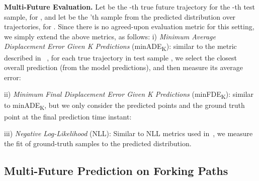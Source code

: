 \documentclass[10pt,twocolumn,letterpaper]{article}
\begin{document}
\noindent\textbf{Multi-Future Evaluation.}
Let  be the -th true future trajectory for the -th test sample, for ,
and let  be the 'th sample from the predicted
distribution over trajectories, for .
Since there is no agreed-upon evaluation metric for this setting,
we simply extend the above metrics, as follows:
\noindent i) \textit{Minimum Average Displacement Error Given K Predictions} (minADE\textsubscript{K}): similar to the metric described in ~\cite{chai2019multipath, rhinehart2018r2p2,rhinehart2019precog, gupta2018social}, for each true trajectory  in test sample ,
we select
the closest overall prediction (from the  model predictions),
and then measure its average error:


\noindent ii) \textit{Minimum Final Displacement Error Given K Predictions} (minFDE\textsubscript{K}): similar to minADE\textsubscript{K}, but we only consider the predicted points and the ground truth point at the final prediction time instant:


\noindent iii) \textit{Negative Log-Likelihood} (NLL):
Similar to NLL metrics used in~\cite{makansi2019overcoming,chai2019multipath}, we measure the
fit of ground-truth samples to the predicted distribution.
 \subsection{Multi-Future Prediction on Forking Paths}\label{sec:exp-multi}
\end{document}
